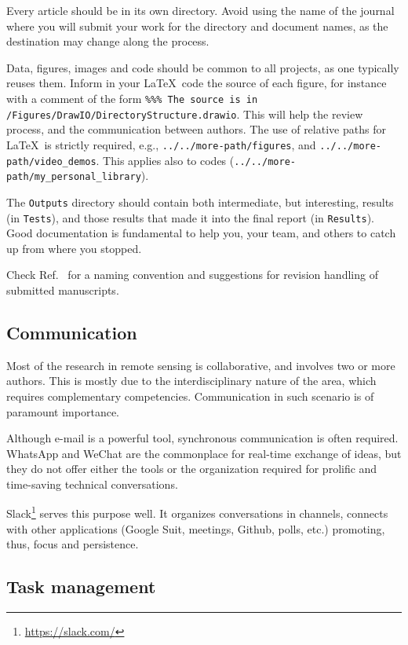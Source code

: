 \documentclass[journal,twoside]{IEEEtran}
\begin{document}
Every article should be in its own directory.
Avoid using the name of the journal where you will submit your work for the directory and document names, as the destination may change along the process.

Data, figures, images and code should be common to all projects, as one typically reuses them.
Inform in your \LaTeX\ code the source of each figure, for instance with a comment of the form \texttt{\%\%\% The source is in /Figures/DrawIO/DirectoryStructure.drawio}.
This will help the review process, and the communication between authors. 
The use of relative paths  for \LaTeX\  is strictly required, e.g., \texttt{../../more-path/figures}, and \texttt{../../more-path/video\_demos}. 
This applies also to codes (\texttt{../../more-path/my\_personal\_library}).


The \verb|Outputs| directory should contain both intermediate, but interesting, results (in \verb|Tests|), and those results that made it into the final report (in \verb|Results|).
Good documentation is fundamental to help you, your team, and others to catch up from where you stopped.	

Check Ref.~\cite{EditorialGRSL2015} for a naming convention and suggestions for revision handling of submitted manuscripts.

\subsection{Communication}

Most of the research in remote sensing is collaborative, and involves two or more authors.
This is mostly due to the interdisciplinary nature of the area, which requires complementary competencies.
Communication in such scenario is of paramount importance.

Although e-mail is a powerful tool, synchronous communication is often required.
WhatsApp and WeChat are the commonplace for real-time exchange of ideas, but they do not offer either the tools or the organization required for prolific and time-saving technical conversations.

Slack\footnote{\url{https://slack.com/}} serves this purpose well.
It organizes conversations in channels, connects with other applications (Google Suit, meetings, Github, polls, etc.) promoting, thus, focus and persistence.

\subsection{Task management}
\end{document}
